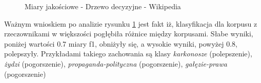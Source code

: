 \begin{figure}[ht!]
	\centering
    \qquad
	\caption{Miary jakościowe - Drzewo decyzyjne - Wikipedia}
    \label{fig:report-dt-wikipedia}
\end{figure}

Ważnym wnioskiem po analizie rysunku \ref{fig:report-dt-wikipedia} jest fakt iż, klasyfikacja dla korpusu z rzeczownikami w większości pogłębiła różnice między korpusami. Słabe wyniki, poniżej wartości 0.7 miary f1, obniżyły się, a wysokie wyniki, powyżej 0.8, polepszyły. Przykładami takiego zachowania są klasy \textit{karkonosze} (polepszenie), \textit{żydzi} (pogorszenie), \textit{propaganda-polityczna} (pogorszenie), \textit{gałęzie-prawa} (pogorszenie)



\clearpage
